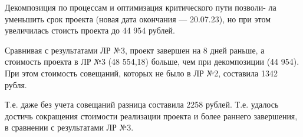 Декомпозиция по процессам и оптимизация критического пути позволи- ла уменьшить срок проекта (новая дата окончания — 20.07.23), но при этом увеличилась стоисть проекта до 44 954 рублей.



\clearpage


Сравнивая с результатами ЛР №3, проект завершен на 8 дней раньше, а стоимость проекта в ЛР №3 (48 554,18) больше, чем при декомпозиции (44 954). При этом стоимость совещаний, которых не было в ЛР №2, составила 1342 рубля. 

Т.е. даже без учета совещаний разница составила 2258 рублей. Т.е. удалось достичь сокращения стоимости реализации проекта и более раннего завершения, в сравнении с результатами ЛР №3.